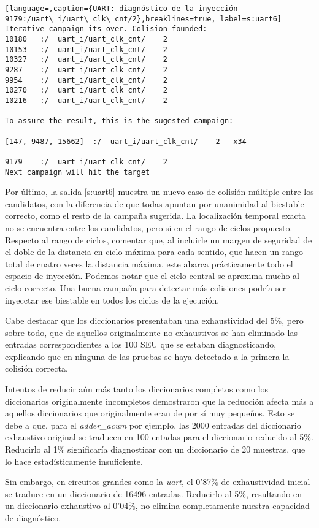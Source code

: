 \begin{lstlisting}[language=,caption={UART: diagnóstico de la inyección
9179:/uart\_i/uart\_clk\_cnt/2},breaklines=true, label=s:uart6]
Iterative campaign its over. Colision founded:
10180	:/	uart_i/uart_clk_cnt/	2
10153	:/	uart_i/uart_clk_cnt/	2
10327	:/	uart_i/uart_clk_cnt/	2
9287	:/	uart_i/uart_clk_cnt/	2
9954	:/	uart_i/uart_clk_cnt/	2
10270	:/	uart_i/uart_clk_cnt/	2
10216	:/	uart_i/uart_clk_cnt/	2

To assure the result, this is the sugested campaign:

[147, 9487, 15662]	:/	uart_i/uart_clk_cnt/	2	x34

9179	:/	uart_i/uart_clk_cnt/	2
Next campaign will hit the target
\end{lstlisting}

Por último, la salida \ref{s:uart6} muestra un nuevo caso de colisión múltiple
entre los candidatos, con la diferencia de que todas apuntan por unanimidad al
biestable correcto, como el resto de la campaña sugerida. La localización temporal 
exacta no se encuentra entre los candidatos, pero si en el rango de ciclos
propuesto. Respecto al rango de ciclos, comentar que, al incluirle un margen de
seguridad de el doble de la distancia en ciclo máxima para cada sentido, que hacen
un rango total de cuatro veces la distancia máxima, este abarca prácticamente todo
el espacio de inyección. Podemos notar que el ciclo central se aproxima mucho al
ciclo correcto. Una buena campaña para detectar más colisiones podría ser
inyecctar ese biestable en todos los ciclos de la ejecución.

Cabe destacar que los diccionarios presentaban una exhaustividad del 5\%, pero
sobre todo, que de aquellos originalmente no exhaustivos se han eliminado las
entradas correspondientes a los 100 \gls{SEU} que se estaban diagnosticando,
explicando que en ninguna de las pruebas se haya detectado a la primera la
colisión correcta.

Intentos de reducir aún más tanto los diccionarios completos como los diccionarios 
originalmente incompletos demostraron que la reducción afecta más a aquellos
diccionarios que originalmente eran de por sí muy pequeños. Esto se debe a que,
para el \textit{adder\_acum} por ejemplo, las 2000 entradas del diccionario
exhaustivo original se traducen en 100 entadas para el diccionario reducido al
5\%. Reducirlo al 1\% significaría diagnosticar con un diccionario de 20 muestras,
que lo hace estadísticamente insuficiente.

Sin embargo, en circuitos grandes como la \textit{uart}, el 0'87\% de
exhaustividad inicial se traduce en un diccionario de 16496 entradas. Reducirlo al
5\%, resultando en un diccionario exhaustivo al 0'04\%, no elimina completamente
nuestra capacidad de diagnóstico.

\endinput
